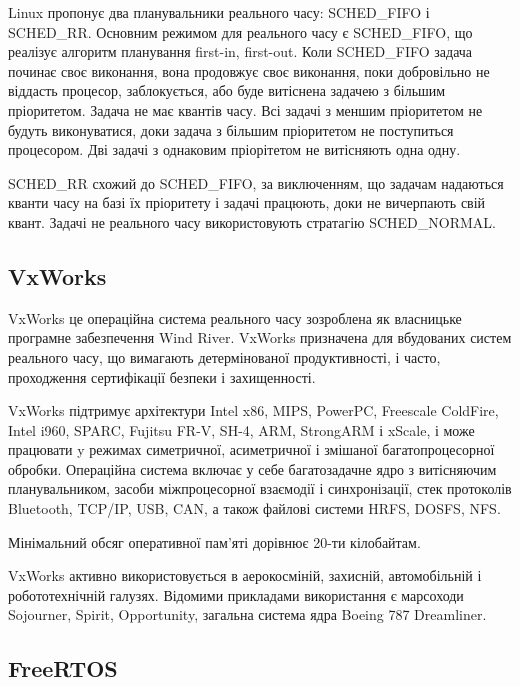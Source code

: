 \documentclass[oneside,14pt,a4paper,final]{myextreport}
\begin{document}
\newcommand{\FIFO}[0]{SCHED\_FIFO}
\newcommand{\RR}[0]{SCHED\_RR}

Linux пропонує два планувальники реального часу: SCHED\_FIFO і SCHED\_RR. Основним режимом для реального часу є SCHED\_FIFO, що реалізує алгоритм планування first-in, first-out. Коли \FIFO{} задача починає своє виконання, вона продовжує своє виконання, поки добровільно не віддасть процесор, заблокується, або буде витіснена задачею з більшим пріоритетом. Задача не має квантів часу. Всі задачі з меншим пріоритетом не будуть виконуватися, доки задача з більшим пріоритетом не поступиться процесором. Дві задачі з однаковим пріорітетом не витісняють одна одну.

\RR{} схожий до \FIFO{}, за виключенням, що задачам надаються кванти часу на базі їх пріоритету і задачі працюють, доки не вичерпають свій квант. Задачі не реального часу використовують стратагію SCHED\_NORMAL.

\subsection{VxWorks}

VxWorks\cite{vxworks} це операційна система реального часу зозроблена як власницьке програмне забезпечення Wind River. VxWorks призначена для вбудованих систем реального часу, що вимагають детермінованої продуктивності, і часто, проходження сертифікації безпеки і захищенності.

VxWorks підтримує архітектури Intel x86, MIPS, PowerPC, Freescale ColdFire, Intel i960, SPARC, Fujitsu FR-V, SH-4, ARM, StrongARM і xScale, і може працювати y режимах симетричної, асиметричної і змішаної багатопроцесорної обробки. Операційна система включає у себе багатозадачне ядро з витісняючим планувальником, засоби міжпроцесорної взаємодії і синхронізації, стек протоколів Bluetooth, \acs{TCP/IP}, \acs{USB}, \acs{CAN}, а також файлові системи \ac{HRFS}, \acs{DOSFS}, \ac{NFS}.

Мінімальний обсяг оперативної пам'яті дорівнює 20-ти кілобайтам.

VxWorks активно використовується в аерокосміній, захисній, автомобільній і робототехнічній галузях. Відомими прикладами використання є марсоходи Sojourner, Spirit, Opportunity\cite{vxworks:rovers}, загальна система ядра Boeing 787 Dreamliner\cite{vxworks:boeing}.

\subsection{FreeRTOS}
\end{document}
